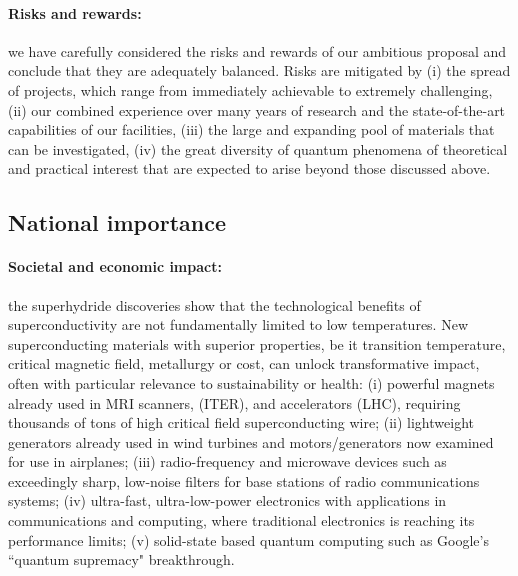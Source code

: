 \paragraph{Risks and rewards:} we have carefully considered the risks and
rewards of our ambitious proposal and conclude that they are
adequately balanced. Risks are mitigated by (i) the spread of
projects, which range from immediately achievable to extremely
challenging, (ii) our combined experience over many years of research
and the state-of-the-art capabilities of our facilities, (iii) the large
and expanding pool of materials that can be investigated, (iv) the
great diversity of quantum phenomena of theoretical and practical
interest that are expected to arise beyond those discussed above.



\subsection*{National importance}
\paragraph{Societal and economic impact:}
the superhydride discoveries show that the technological benefits of superconductivity are not fundamentally limited to low temperatures. 
New superconducting materials with superior properties, be it transition temperature,
critical magnetic field, metallurgy or cost, 
can unlock transformative impact, often with particular relevance to sustainability or health: 
(i) powerful magnets already used in MRI scanners, %
  (ITER), and accelerators (LHC), requiring  thousands of tons of high critical field superconducting wire; 
(ii) lightweight generators already used in wind turbines and motors/generators now examined for use in airplanes;   
(iii) radio-frequency and microwave devices such as exceedingly sharp, low-noise filters for base stations of radio communications systems; 
(iv) ultra-fast, ultra-low-power electronics with applications in communications and computing, where traditional electronics is reaching its performance limits; 
(v) solid-state based quantum computing such as Google's ``quantum supremacy" breakthrough.

